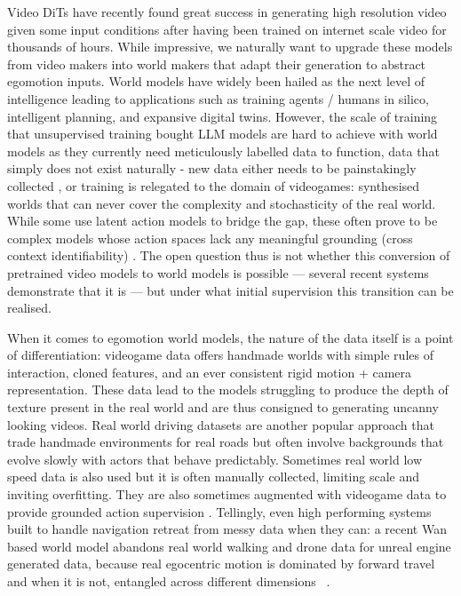 \documentclass[letterpaper]{article} %
\begin{document}
Video DiTs have recently found great success in generating high resolution video given some input conditions after having been trained on internet scale video for thousands of hours. While impressive, we naturally want to upgrade these models from video makers into world makers that adapt their generation to abstract egomotion inputs. World models have widely been hailed as the next level of intelligence leading to applications such as training agents / humans in silico, intelligent planning, and expansive digital twins. However, the scale of training that unsupervised training bought LLM models are hard to achieve with world models as they currently need meticulously labelled data to function, data that simply does not exist naturally - new data either needs to be painstakingly collected \cite{navwormod, cameracontrol2, cosmos2, uniwm, xworld, gaia2}, or training is relegated to the domain of videogames: \cite{gamengen2024, diamond, olafworld, mineworld, gamefactory, oasis2} synthesised worlds that can never cover the complexity and stochasticity of the real world. While some use latent action models to bridge the gap, these often prove to be complex models whose action spaces lack any meaningful grounding (cross context identifiability) \cite{genie, gamengen2024, olafworld, adaworld}. The open question thus is not whether this conversion of pretrained video models to world models is possible --- several recent systems demonstrate that it is --- but under what initial supervision this transition can be realised.

When it comes to egomotion world models, the nature of the data itself is a point of differentiation: videogame data offers handmade worlds with simple rules of interaction, cloned features, and an ever consistent rigid motion + camera representation. These data lead to the models struggling to produce the depth of texture present in the real world and are thus consigned to generating uncanny looking videos. Real world driving datasets are another popular approach that trade handmade environments for real roads but often involve backgrounds that evolve slowly with actors that behave predictably. Sometimes real world low speed data is also used \cite{navwormod} but it is often manually collected, limiting scale and inviting overfitting. They are also sometimes augmented with videogame data to provide grounded action supervision \cite{diffusionworldmodels}. Tellingly, even high performing systems built to handle navigation retreat from messy data when they can: a recent Wan based world model abandons real world walking and drone data for unreal engine generated data, because real egocentric motion is dominated by forward travel and when it is not, entangled across different dimensions ~\cite{relic}.
\end{document}
